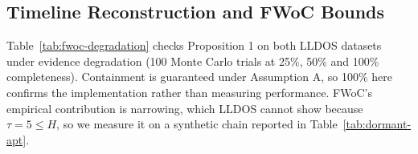 \documentclass[12pt]{article}
\begin{document}
\subsection{Timeline Reconstruction and FWoC Bounds}\label{sec:results-fwoc}

Table~\ref{tab:fwoc-degradation} checks Proposition 1 on both LLDOS datasets under evidence degradation (100 Monte Carlo trials at 25\%, 50\% and 100\% completeness). Containment is guaranteed under Assumption A, so 100\% here confirms the implementation rather than measuring performance. FWoC's empirical contribution is narrowing, which LLDOS cannot show because $\tau=5\le H$, so we measure it on a synthetic chain reported in Table~\ref{tab:dormant-apt}.

\begin{table}[t]
\centering
\caption{Consistency check of Proposition 1 under evidence degradation for LLDOS 1.0 and 2.0.2 (100 Monte Carlo trials each). Soundness reports 95\% Wilson score confidence intervals. Tightness represents the mean FWoC width as a percentage of observation duration $\tau$. Ambiguity $k = |\mathcal{P}_{surviving}|$ denotes surviving candidate paths. *For LLDOS, overlap and containment soundness coincide due to tight true execution spans.}
\label{tab:fwoc-degradation}
\end{table}
\end{document}
